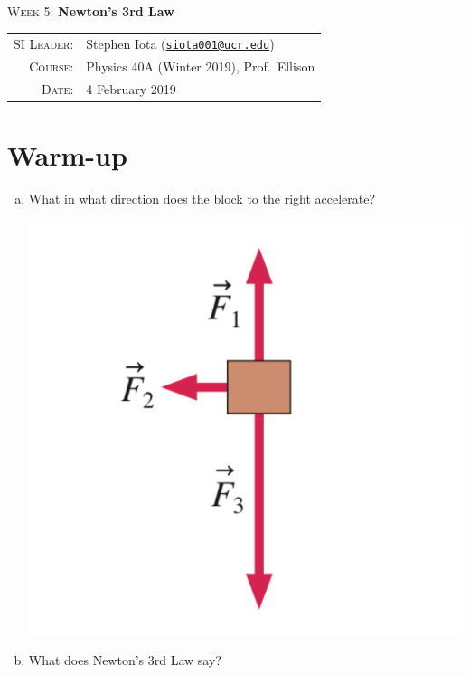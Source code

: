 \documentclass[10pt]{article}
\newcommand{\email}[1]{\texttt{\href{mailto:#1}{#1}}}
\begin{document}
\begin{center}

\Large{\textsc{Week 5}: \textbf{Newton's 3rd Law}}

\end{center}

\vspace{.5mm}



\begin{tabular}{rl}
\textsc{SI Leader}:
&
Stephen Iota (\email{siota001@ucr.edu})
\\
\textsc{Course}:
&
Physics 40A (Winter 2019), Prof.~Ellison
\\
\textsc{Date}:
&
4 February 2019
\end{tabular}


\section{Warm-up}
\begin{enumerate}[(a)]
	\item What in what direction does the block to the right accelerate?
	\begin{center}
	\includegraphics[width=.2\linewidth]{PS5-FigA}
	\end{center}
	\item What does Newton's 3rd Law say?
\end{enumerate}
\end{document}
